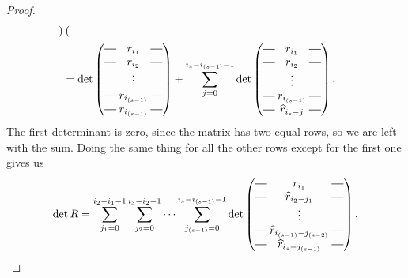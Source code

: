 \begin{proof}
\begin{align*}
\begin{pmatrix}
    \end{pmatrix} \\
            &=   \det\begin{pmatrix}
              \matrow{r_{i_1}} \\
              \matrow{r_{i_2}} \\
              & \hspace{-0.75em} \vdots & \\
              \matrow{r_{i_{(s-1)}}} \\
              \matrow{r_{i_{(s-1)}}}
            \end{pmatrix}
    + \sum_{j=0}^{i_s-i_{(s-1)}-1} \det\begin{pmatrix}
      \matrow{r_{i_1}} \\
      \matrow{r_{i_2}} \\
      & \hspace{-0.75em} \vdots & \\
      \matrow{r_{i_{(s-1)}}} \\
      \matrow{\widehat{r}_{i_s-j}} \end{pmatrix}.
  \end{align*}
  The first determinant is zero, since the matrix has two equal rows,
  so we are left with the sum. Doing the same thing for all the other
  rows except for the first one gives us
  \[ \det R = \sum_{j_1 = 0}^{i_2-i_1-1}\sum_{j_2 = 0}^{i_3-i_2-1}
  \dots \sum_{j_{(s-1)}=0}^{i_s-i_{(s-1)}-1} \det
  \begin{pmatrix}
    \matrow{r_{i_1}} \\
    \matrow{\widehat{r}_{i_2-j_1}} \\
    & \hspace{-0.75em} \vdots & \\
    \matrow{\widehat{r}_{i_{(s-1)}-j_{(s-2)}}} \\
    \matrow{\widehat{r}_{i_s-j_{(s-1)}}}
  \end{pmatrix}. \]
  

\end{proof}
